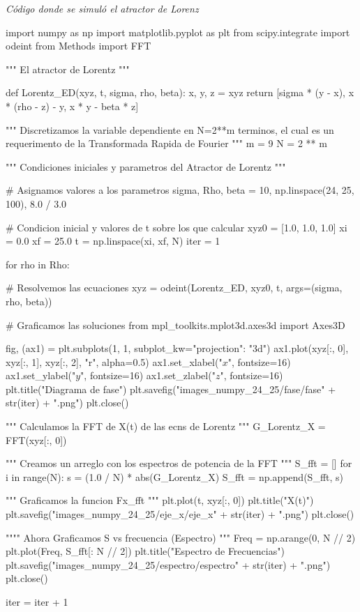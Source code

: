 \emph{Código donde se simuló el atractor de Lorenz}

\begin{python}
    import numpy as np
    import matplotlib.pyplot as plt
    from scipy.integrate import odeint
    from Methods import FFT

    """
    El atractor de Lorentz
    """


    def Lorentz_ED(xyz, t, sigma, rho, beta):
    x, y, z = xyz
    return [sigma * (y - x), x * (rho - z) - y, x * y - beta * z]


    """
    Discretizamos la variable dependiente en N=2**m terminos,
    el cual es un requerimento de la Transformada Rapida de Fourier
    """
    m = 9
    N = 2 ** m


    """
    Condiciones iniciales y parametros del Atractor de Lorentz
    """

    # Asignamos valores a los parametros
    sigma, Rho, beta = 10, np.linspace(24, 25, 100), 8.0 / 3.0

    # Condicion inicial y valores de t sobre los que calcular
    xyz0 = [1.0, 1.0, 1.0]
    xi = 0.0
    xf = 25.0
    t = np.linspace(xi, xf, N)
    iter = 1

    for rho in Rho:

    # Resolvemos las ecuaciones
    xyz = odeint(Lorentz_ED, xyz0, t, args=(sigma, rho, beta))

    # Graficamos las soluciones
    from mpl_toolkits.mplot3d.axes3d import Axes3D

    fig, (ax1) = plt.subplots(1, 1, subplot_kw={"projection": "3d"})
    ax1.plot(xyz[:, 0], xyz[:, 1], xyz[:, 2], "r", alpha=0.5)
    ax1.set_xlabel("$x$", fontsize=16)
    ax1.set_ylabel("$y$", fontsize=16)
    ax1.set_zlabel("$z$", fontsize=16)
    plt.title("Diagrama de fase")
    plt.savefig("images_numpy_24_25/fase/fase" + str(iter) + ".png")
    plt.close()

    """
    Calculamos la FFT de X(t) de las ecns de Lorentz
    """
    G_Lorentz_X = FFT(xyz[:, 0])

    """
    Creamos un arreglo con los espectros de potencia de la FFT
    """
    S_fft = []
    for i in range(N):
    s = (1.0 / N) * abs(G_Lorentz_X)
    S_fft = np.append(S_fft, s)

    """
    Graficamos la funcion Fx_fft
    """
    plt.plot(t, xyz[:, 0])
    plt.title("X(t)")
    plt.savefig("images_numpy_24_25/eje_x/eje_x" + str(iter) + ".png")
    plt.close()

    """"
    Ahora Graficamos S vs frecuencia (Espectro)
    """
    Freq = np.arange(0, N // 2)
    plt.plot(Freq, S_fft[: N // 2])
    plt.title("Espectro de Frecuencias")
    plt.savefig("images_numpy_24_25/espectro/espectro" + str(iter) + ".png")
    plt.close()

    iter = iter + 1
\end{python}